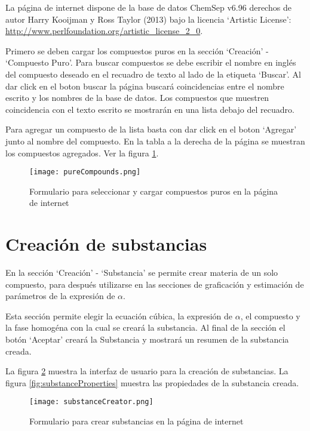 	La página de internet dispone de la base de datos ChemSep v6.96 derechos de autor  Harry Kooijman y Ross Taylor (2013) bajo la licencia `Artistic License': \url{ http://www.perlfoundation.org/artistic_license_2_0}.

	Primero se deben cargar los compuestos puros en la sección `Creación' - `Compuesto Puro'. Para buscar compuestos se debe escribir el nombre en inglés del compuesto deseado en el recuadro de texto al lado de la etiqueta `Buscar'. Al dar click en el boton buscar la página buscará coincidencias entre el nombre escrito y los nombres de la base de datos. Los compuestos que muestren coincidencia con el texto escrito se mostrarán en una lista debajo del recuadro.

	Para agregar un compuesto de la lista basta con dar click en el boton `Agregar' junto al nombre del compuesto. En la tabla a la derecha de la página se muestran los compuestos agregados. Ver la figura \ref{fig:pureCompounds}.

	\begin{figure}[!h]
		\centering
		\texttt{[image: pureCompounds.png]}
		\caption{Formulario para seleccionar y cargar compuestos puros en la página de internet}
		\label{fig:pureCompounds}
	\end{figure}

\section{Creación de substancias}\label{sec:webSubstanceCreator}
	
	En la sección `Creación' - `Substancia' se permite crear materia de un solo compuesto, para después utilizarse en las secciones de graficación y estimación de parámetros de la expresión de $\alpha$.

	Esta sección permite elegir la ecuación cúbica, la expresión de $\alpha$, el compuesto y la fase homogéna con la cual se creará la substancia. Al final de la sección el botón `Aceptar' creará la Substancia y mostrará un resumen de la substancia creada.

	La figura \ref{fig:substanceCreator} muestra la interfaz de usuario para la creación de substancias. La figura \ref{fig:substanceProperties} muestra las propiedades de la substancia creada.

	\begin{figure}[!h]
		\texttt{[image: substanceCreator.png]}
		\caption{Formulario para crear substancias en la página de internet}
		\label{fig:substanceCreator}
	\end{figure}

